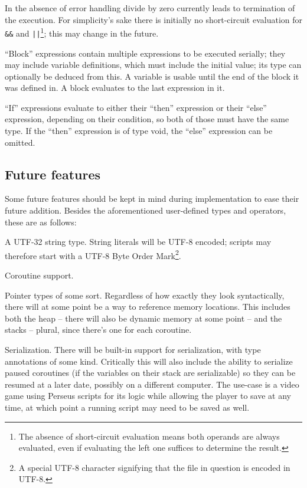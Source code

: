 			In the absence of error handling divide by zero currently leads to termination of the execution. For simplicity's sake there is initially no short-circuit evaluation for \lstinline$&&$ and \lstinline$||$\footnote{The absence of short-circuit evaluation means both operands are always evaluated, even if evaluating the left one suffices to determine the result.}; this may change in the future.
			
			``Block'' expressions contain multiple expressions to be executed serially; they may include variable definitions, which must include the initial value; its type can optionally be deduced from this. A variable is usable until the end of the block it was defined in. A block evaluates to the last expression in it.
			
			``If'' expressions evaluate to either their ``then'' expression or their ``else'' expression, depending on their condition, so both of those must have the same type. If the ``then'' expression is of type void, the ``else'' expression can be omitted.
        
        \subsection{Future features}
        	
        	Some future features should be kept in mind during implementation to ease their future addition. Besides the aforementioned user-defined types and operators, these are as follows:
        	
        	A UTF-32 string type. String literals will be UTF-8 encoded; scripts may therefore start with a UTF-8 Byte Order Mark\footnote{A special UTF-8 character signifying that the file in question is encoded in UTF-8.}.
        	
        	Coroutine support. %
        	
        	Pointer types of some sort. Regardless of how exactly they look syntactically, there will at some point be a way to reference memory locations. This includes both the heap -- there will also be dynamic memory at some point -- and the stacks -- plural, since there's one for each coroutine.
        	
        	Serialization. There will be built-in support for serialization, with type annotations of some kind. Critically this will also include the ability to serialize paused coroutines (if the variables on their stack are serializable) so they can be resumed at a later date, possibly on a different computer. The use-case is a video game using Perseus scripts for its logic while allowing the player to save at any time, at which point a running script may need to be saved as well.
            
